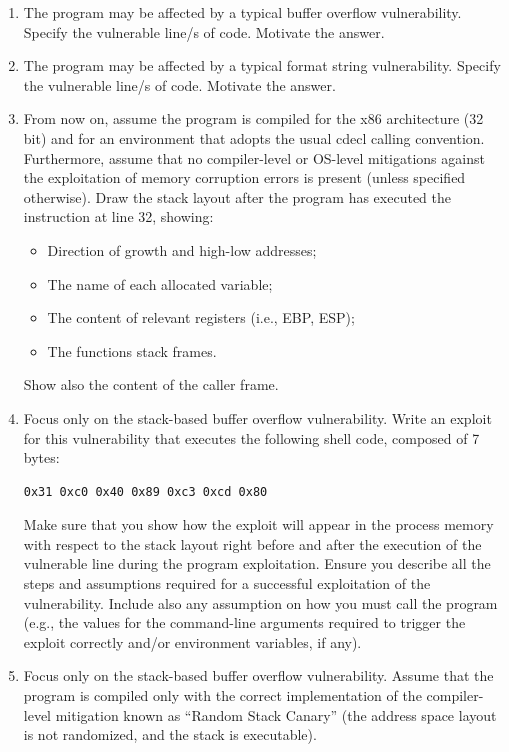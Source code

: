 \begin{enumerate}
    \item The program may be affected by a typical buffer overflow vulnerability. 
        Specify the vulnerable line/s of code. 
        Motivate the answer.
    \item The program may be affected by a typical format string vulnerability. 
        Specify the vulnerable line/s of code. 
        Motivate the answer.
    \item From now on, assume the program is compiled for the x86 architecture (32 bit) and for an environment that adopts the usual cdecl calling convention. 
        Furthermore, assume that no compiler-level or OS-level mitigations against the exploitation of memory corruption errors is present (unless specified otherwise). 
        Draw the stack layout after the program has executed the instruction at line 32, showing:
        \begin{itemize}
            \item Direction of growth and high-low addresses;
            \item The name of each allocated variable;
            \item The content of relevant registers (i.e., EBP, ESP);
            \item The functions stack frames.
        \end{itemize}
        Show also the content of the caller frame.
    \item Focus only on the stack-based buffer overflow vulnerability. 
        Write an exploit for this vulnerability that executes the following shell code, composed of 7 bytes: 
\begin{verbatim}
0x31 0xc0 0x40 0x89 0xc3 0xcd 0x80   
\end{verbatim}
        Make sure that you show how the exploit will appear in the process memory with respect to the stack layout right before and after the execution of the vulnerable line during the program exploitation.
        Ensure you describe all the steps and assumptions required for a successful exploitation of the vulnerability. 
        Include also any assumption on how you must call the program (e.g., the values for the command-line arguments required to trigger the exploit correctly and/or environment variables, if any).
    \item Focus only on the stack-based buffer overflow vulnerability. 
        Assume that the program is compiled only with the correct implementation of the compiler-level mitigation known as “Random Stack Canary” (the address space layout is not randomized, and the stack is executable). 

\end{enumerate}
